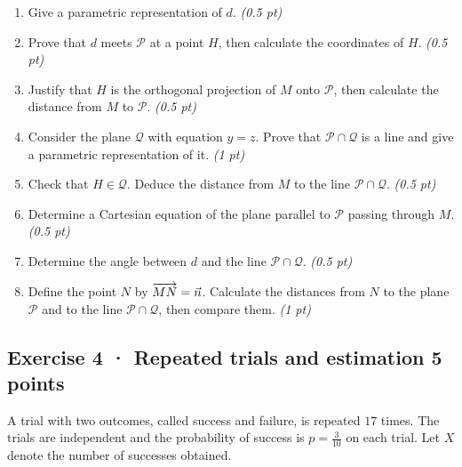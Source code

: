 \begin{enumerate}

\item Give a parametric representation of $d$. \hfill\textit{(0.5 pt)}

\item Prove that $d$ meets $\mathcal P$ at a point $H$, then calculate the coordinates of $H$. \hfill\textit{(0.5 pt)}

\item Justify that $H$ is the orthogonal projection of $M$ onto $\mathcal P$, then calculate the distance from $M$ to $\mathcal P$. \hfill\textit{(0.5 pt)}

\item Consider the plane $\mathcal Q$ with equation $y=z$. Prove that $\mathcal P\cap\mathcal Q$ is a line and give a parametric representation of it. \hfill\textit{(1 pt)}

\item Check that $H\in\mathcal Q$. Deduce the distance from $M$ to the line $\mathcal P\cap\mathcal Q$. \hfill\textit{(0.5 pt)}

\item Determine a Cartesian equation of the plane parallel to $\mathcal P$ passing through $M$. \hfill\textit{(0.5 pt)}

\item Determine the angle between $d$ and the line $\mathcal P\cap\mathcal Q$. \hfill\textit{(0.5 pt)}

\item Define the point $N$ by $\overrightarrow{MN}=\vec n$. Calculate the distances from $N$ to the plane $\mathcal P$ and to the line $\mathcal P\cap\mathcal Q$, then compare them. \hfill\textit{(1 pt)}

\end{enumerate}

\subsection*{Exercise 4 · Repeated trials and estimation \hfill 5 points}A trial with two outcomes, called success and failure, is repeated $17$ times. The trials are independent and the probability of success is $p=\frac{3}{10}$ on each trial. Let $X$ denote the number of successes obtained.

